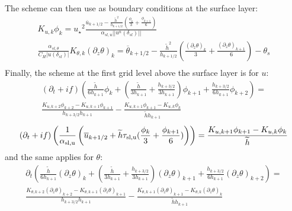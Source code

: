 The scheme can then use as boundary conditions at the surface layer:
\begin{equation}
\label{eq:ND_StratifiedCase_boundaryConditionFVfree}
\begin{aligned}
	K_{u,k} \phi_k = {u_\star}^2
  \frac{\overline{u}_{k+1/2} - \frac{\widetilde{h}^2}{h_{k+1/2}}
	(\frac{\phi_k}{3} + \frac{\phi_{k+1}}{6})}
	{\alpha_{sl, u}||u^n(\delta_{sl})||} \\
  \frac{\alpha_{sl, \theta} }
  {C_H |u(\delta_{sl})|}
	K_{\theta, k} (\partial_z \theta)_k = 
  \overline{\theta}_{k+1/2} - \frac{\widetilde{h}^2}{h_{k+1/2}}
	(\frac{{(\partial_z \theta)}_k}{3} +
	\frac{{(\partial_z \theta)}_{k+1}}{6}) 
  - \theta_s\\
\end{aligned}
\end{equation}
Finally, the scheme at the first grid level above
the surface layer is for $u$:
\begin{equation}
\label{eq:ND_StratifiedCase_prognosticu_FVfree}
    \begin{aligned}
(\partial_t + if)
	    \left(\frac{\widetilde{h}}{6h_{k+1}} 
    \phi_k
    +
    \left(
	    \frac{\widetilde{h}}{3h_{k+1}} 
	    + \frac{h_{k+3/2}}{3h_{k+1}}
    \right)
	    \phi_{k+1}
	    + \frac{h_{k+3/2}}{6h_{k+1}} \phi_{k+2}\right)
    = \\
	    \frac{K_{u, k+2} \phi_{k+2} - K_{u, k+1} \phi_{k+1}}
	    {h_{k+3/2}h_{k+1}} - \frac{K_{u, k+1} \phi_{k+1} -
	    K_{u,k} \phi_k }{\widetilde{h}h_{k+1}}
    \end{aligned}
\end{equation}
\begin{equation}
	\label{eq:ND_StratifiedCase_semiDiscreteEkmanEqFVfree}
	(\partial_t+if) \left(\frac{1}{\alpha_{\rm sl, u}}
	\left(\overline{u}_{k+1/2} + \widetilde{h}\tau_{\rm sl, u}
	(\frac{\phi_k}{3} + \frac{\phi_{k+1}}{6})\right)\right)
	= \frac{K_{u, k+1}\phi_{k+1} - K_{u,k} \phi_k}{\widetilde{h}}
\end{equation}
and the same applies for $\theta$:
\begin{equation}
\label{eq:ND_StratifiedCase_prognosticPT_FVfree}
    \begin{aligned}
\partial_t \left(\frac{\widetilde{h}}{6h_{k+1}} 
	    {(\partial_z \theta)}_k
    +
    \left(
	    \frac{\widetilde{h}}{3h_{k+1}} 
	    + \frac{h_{k+3/2}}{3h_{k+1}}
    \right)
	    {(\partial_z \theta)}_{k+1}
	    + \frac{h_{k+3/2}}{6h_{k+1}} {(\partial_z \theta)}_{k+2}\right)
    = \\
	    \frac{K_{\theta, k+2} {(\partial_z \theta)}_{k+2} -
	    K_{\theta, k+1} {(\partial_z \theta)}_{k+1}}
	    {h_{k+3/2}h_{k+1}} - \frac{K_{\theta, k+1} {(\partial_z \theta)}_{k+1} -
	    K_{\theta, k} {(\partial_z \theta)}_k }{\widetilde{h}h_{k+1}}
    \end{aligned}
\end{equation}
